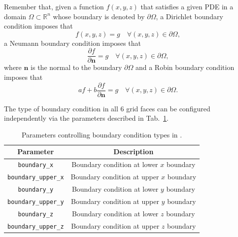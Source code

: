 Remember that, given a function $f(x,y,z)$ that satisfies a given PDE in a domain $\Omega \subset \mathbb{R}^n$ whose boundary is denoted by $\partial\Omega$, a Dirichlet boundary condition imposes that
%
\begin{equation}
  f(x,y,z) = g \quad \forall (x,y,z) \in \partial \Omega,
  \label{eq:dirichlet}
\end{equation}
%
a Neumann boundary condition imposes that
%
\begin{equation}
  \frac{\partial f}{\partial \mathbf{n}} = g \quad \forall (x,y,z) \in \partial \Omega,
  \label{eq:neumann}
\end{equation}
%
where $\mathbf{n}$ is the normal to the boundary $\partial \Omega$ and a Robin boundary condition imposes that
%
\begin{equation}
  a f + b \frac{\partial f}{\partial \mathbf{n}} = g \quad \forall (x,y,z) \in \partial \Omega.
  \label{eq:robin}
\end{equation}

The type of boundary condition in all 6 grid faces can be configured independently via the parameters described in Tab.~\ref{tab:boundary_settings}.

\begin{table}[ht]
    \centering
    \begin{tabular}{cc}
    Parameter                   & Description                             \\\hline\hline
    \texttt{boundary\_x}        & Boundary condition at lower $x$ boundary\\
    \texttt{boundary\_upper\_x} & Boundary condition at upper $x$ boundary\\
    \texttt{boundary\_y}        & Boundary condition at lower $y$ boundary\\
    \texttt{boundary\_upper\_y} & Boundary condition at upper $y$ boundary\\
    \texttt{boundary\_z}        & Boundary condition at lower $z$ boundary\\
    \texttt{boundary\_upper\_z} & Boundary condition at upper $z$ boundary\\\hline\hline
    \end{tabular}
    \caption{Parameters controlling boundary condition types in \CarpetX.}
    \label{tab:boundary_settings}
\end{table}

